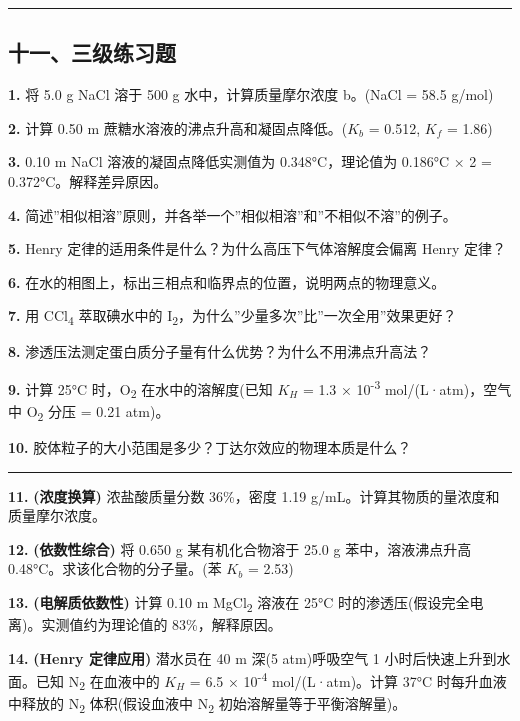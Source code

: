 \begin{center}\rule{0.5\linewidth}{0.5pt}\end{center}

\subsection{十一、三级练习题}\label{ux5341ux4e00ux4e09ux7ea7ux7ec3ux4e60ux9898}

\textbf{1.} 将 5.0 g NaCl 溶于 500 g 水中，计算质量摩尔浓度 b。(NaCl = 58.5 g/mol)

\textbf{2.} 计算 0.50 m 蔗糖水溶液的沸点升高和凝固点降低。(\(K_b\) = 0.512, \(K_f\) = 1.86)

\textbf{3.} 0.10 m NaCl 溶液的凝固点降低实测值为 0.348°C，理论值为 0.186°C × 2 = 0.372°C。解释差异原因。

\textbf{4.} 简述''相似相溶''原则，并各举一个''相似相溶''和''不相似不溶''的例子。

\textbf{5.} Henry 定律的适用条件是什么？为什么高压下气体溶解度会偏离 Henry 定律？

\textbf{6.} 在水的相图上，标出三相点和临界点的位置，说明两点的物理意义。

\textbf{7.} 用 CCl\textsubscript{4} 萃取碘水中的 I\textsubscript{2}，为什么''少量多次''比''一次全用''效果更好？

\textbf{8.} 渗透压法测定蛋白质分子量有什么优势？为什么不用沸点升高法？

\textbf{9.} 计算 25°C 时，O\textsubscript{2} 在水中的溶解度(已知 \(K_H\) = 1.3 × 10\textsuperscript{-3} mol/(L·atm)，空气中 O\textsubscript{2} 分压 = 0.21 atm)。

\textbf{10.} 胶体粒子的大小范围是多少？丁达尔效应的物理本质是什么？

\begin{center}\rule{0.5\linewidth}{0.5pt}\end{center}

\textbf{11.} \textbf{(浓度换算)} 浓盐酸质量分数 36\%，密度 1.19 g/mL。计算其物质的量浓度和质量摩尔浓度。

\textbf{12.} \textbf{(依数性综合)} 将 0.650 g 某有机化合物溶于 25.0 g 苯中，溶液沸点升高 0.48°C。求该化合物的分子量。(苯 \(K_b\) = 2.53)

\textbf{13.} \textbf{(电解质依数性)} 计算 0.10 m MgCl\textsubscript{2} 溶液在 25°C 时的渗透压(假设完全电离)。实测值约为理论值的 83\%，解释原因。

\textbf{14.} \textbf{(Henry 定律应用)} 潜水员在 40 m 深(5 atm)呼吸空气 1 小时后快速上升到水面。已知 N\textsubscript{2} 在血液中的 \(K_H\) = 6.5 × 10\textsuperscript{-4} mol/(L·atm)。计算 37°C 时每升血液中释放的 N\textsubscript{2} 体积(假设血液中 N\textsubscript{2} 初始溶解量等于平衡溶解量)。

